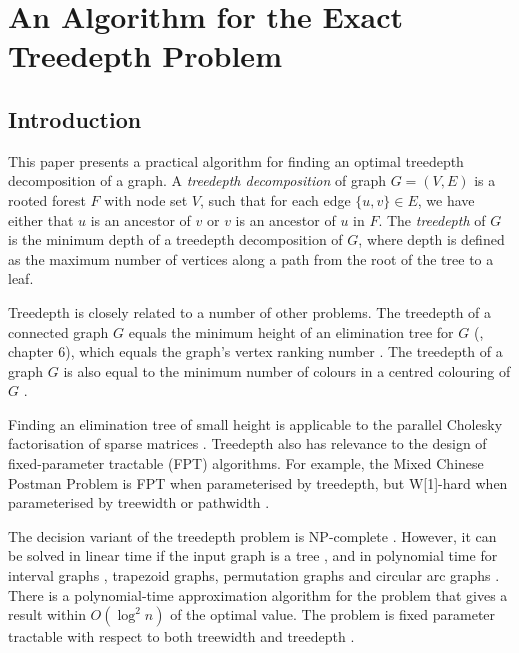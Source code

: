 \chapter{An Algorithm for the Exact Treedepth Problem}

{
    \renewcommand{\arraystretch}{.83}



    \newcommand\Edge{\text{--}}

    \section{Introduction}

    This paper presents a practical algorithm for finding an optimal treedepth decomposition of a graph.
    A \emph{treedepth decomposition} of graph $G=(V,E)$ is a rooted forest $F$ with node set $V$, such that for
    each edge $\{u,v\} \in E$, we have either that $u$ is an ancestor of $v$ or $v$ is an ancestor of $u$
    in $F$.  The \emph{treedepth} of $G$ is the minimum depth of a treedepth decomposition of $G$, where
    depth is defined as the maximum number of vertices along a path from the root of the tree to a leaf.

    Treedepth is closely related to a number of other problems.  The treedepth of a
    connected graph $G$ equals the minimum height of an elimination tree for $G$
    (\cite{DBLP:books/daglib/0030491}, chapter 6), which equals
    the graph's vertex ranking number \cite{DBLP:conf/stacs/DeogunKKM94}.
    The treedepth of a graph $G$ is also equal to the minimum number of
    colours in a centred colouring of $G$ \cite{DBLP:books/daglib/0030491}.

    Finding an elimination tree of small height is applicable to the parallel Cholesky factorisation
    of sparse matrices \cite{zmijewski1986parallel}.
    Treedepth also has relevance to the design of fixed-parameter tractable (FPT) algorithms.  For example,
    the Mixed Chinese Postman Problem is FPT when parameterised by treedepth, but W[1]-hard
    when parameterised by treewidth or pathwidth \cite{DBLP:journals/siamdm/GutinJW16}.

    The decision variant of the treedepth problem is NP-complete \cite{pothen1988complexity}.  However, it can
    be solved in linear time if the input graph is a tree
    \cite{DBLP:journals/ipl/Schaffer89}, and in polynomial time for interval graphs
    \cite{Aspvall1994}, trapezoid graphs, permutation graphs and circular arc
    graphs \cite{DBLP:journals/dam/DeogunKKM99}.  There is a polynomial-time approximation algorithm
    for the problem that gives a result within $O(\log^2 n)$ of the optimal value.
    The problem is fixed parameter
    tractable with respect to both treewidth and treedepth \cite{DBLP:journals/siamdm/BodlaenderDJKKMT98,DBLP:conf/icalp/ReidlRVS14}.

}

